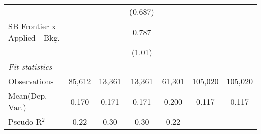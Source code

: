 \begin{tabular}{lcccccc}
                                  &                &               & (0.687)       &               &         &   \\   
   SB Frontier x Applied - Bkg.   &                &               & 0.787         &               &         &   \\   
                                  &                &               & (1.01)        &               &         &   \\   
   \midrule
   \emph{Fit statistics}\\
   Observations                   & 85,612         & 13,361        & 13,361        & 61,301        & 105,020 & 105,020\\  
Mean(Dep. Var.) & 0.170 & 0.171 & 0.171 & 0.200 & 0.117 & 0.117 \\
   Pseudo R$^2$                   & 0.22           & 0.30          & 0.30          & 0.22          &         & \\  
   

\end{tabular}
